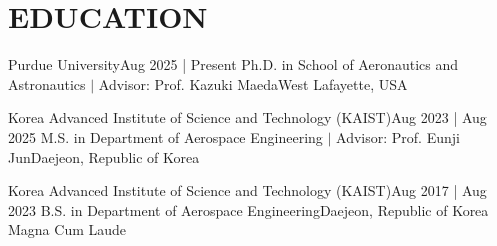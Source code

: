 \section{EDUCATION}
    \resumeSubHeadingListStart

    
    \resumeSubheading
    {Purdue University}{Aug 2025 | Present}
    {Ph.D. in School of Aeronautics and Astronautics $|$ Advisor: Prof. Kazuki Maeda}{West Lafayette, USA}
    {}{}

    \resumeSubheading
    {Korea Advanced Institute of Science and Technology (KAIST)}{Aug 2023 | Aug 2025}
    {M.S. in Department of Aerospace Engineering $|$ Advisor: Prof. Eunji Jun}{Daejeon, Republic of Korea}
    {}{}
    
    \resumeSubheading
    {Korea Advanced Institute of Science and Technology (KAIST)}{Aug 2017 | Aug 2023}
    {B.S. in Department of Aerospace Engineering}{Daejeon, Republic of Korea}
    {Magna Cum Laude}{}
    
    \resumeSubHeadingListEnd